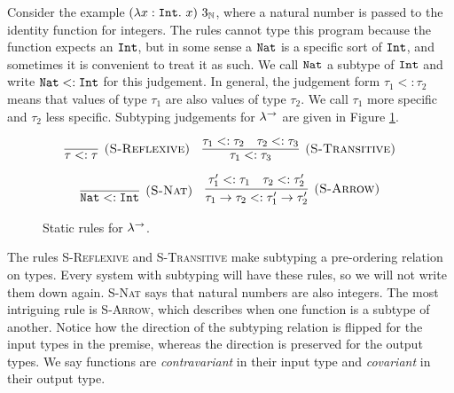 Consider the example $(\lambda x: \mathtt{Int}.~x)~3_{\mathbb{N}}$, where a natural number is passed to the identity function for integers. The rules cannot type this program because the function expects an $\mathtt{Int}$, but in some sense a $\mathtt{Nat}$ is a specific sort of $\mathtt{Int}$, and sometimes it is convenient to treat it as such. We call $\mathtt{Nat}$ a subtype of $\mathtt{Int}$ and write $\mathtt{Nat} <: \mathtt{Int}$ for this judgement. In general, the judgement form $\tau_1 <: \tau_2$ means that values of type $\tau_1$ are also values of type $\tau_2$. We call $\tau_1$ more specific and $\tau_2$ less specific. Subtyping judgements for $\lambda^{\rightarrow}$ are given in Figure \ref{fig:stlc_subtyping}. 

\begin{figure}[h]

\fbox{$\tau <: \tau$}

	
\[
\begin{array}{c}

\infer[\textsc{(S-Reflexive)}]
	{\tau <: \tau}
	{}
	~~~
\infer[\textsc{(S-Transitive)}]
	{\tau_1 <: \tau_3}
	{\tau_1 <: \tau_2 & \tau_2 <: \tau_3}\\[2ex]

\infer[\textsc{(S-Nat)}]
	{\Nat <: \Int}
	{}~~~

\infer[\textsc{(S-Arrow)}]
	{\tau_1 \rightarrow \tau_2 <: \tau_1' \rightarrow \tau_2'}
	{\tau_1' <: \tau_1 & \tau_2 <: \tau_2'}


\end{array}
\]

\vspace{-12pt}
\caption{Static rules for $\lambda^{\rightarrow}$.}
\label{fig:stlc_subtyping}
\end{figure}

The rules \textsc{S-Reflexive} and \textsc{S-Transitive} make subtyping a pre-ordering relation on types. Every system with subtyping will have these rules, so we will not write them down again. \textsc{S-Nat} says that natural numbers are also integers. The most intriguing rule is \textsc{S-Arrow}, which describes when one function is a subtype of another. Notice how the direction of the subtyping relation is flipped for the input types in the premise, whereas the direction is preserved for the output types. We say functions are \textit{contravariant} in their input type and \textit{covariant} in their output type.


